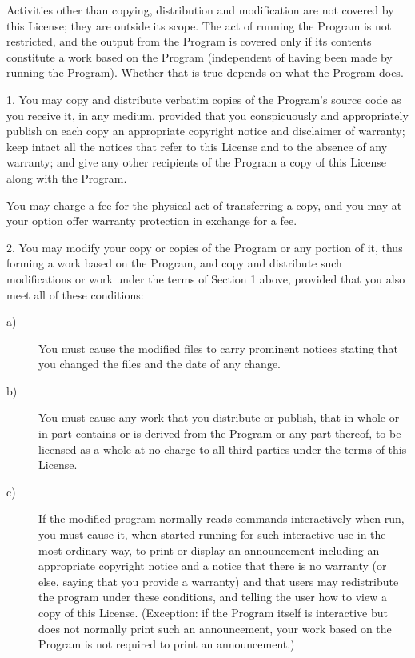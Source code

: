 Activities other than copying, distribution and modification are not
covered by this License; they are outside its scope.  The act of
running the Program is not restricted, and the output from the Program
is covered only if its contents constitute a work based on the
Program (independent of having been made by running the Program).
Whether that is true depends on what the Program does.

  1. You may copy and distribute verbatim copies of the Program's
source code as you receive it, in any medium, provided that you
conspicuously and appropriately publish on each copy an appropriate
copyright notice and disclaimer of warranty; keep intact all the
notices that refer to this License and to the absence of any warranty;
and give any other recipients of the Program a copy of this License
along with the Program.

You may charge a fee for the physical act of transferring a copy, and
you may at your option offer warranty protection in exchange for a fee.

  2. You may modify your copy or copies of the Program or any portion
of it, thus forming a work based on the Program, and copy and
distribute such modifications or work under the terms of Section 1
above, provided that you also meet all of these conditions:

\begin{description}
\item[a)] You must cause the modified files to carry prominent notices
  stating that you changed the files and the date of any change.
\item[b)] You must cause any work that you distribute or publish, that
  in whole or in part contains or is derived from the Program or any
  part thereof, to be licensed as a whole at no charge to all third
  parties under the terms of this License.
\item[c)] If the modified program normally reads commands
  interactively when run, you must cause it, when started running for
  such interactive use in the most ordinary way, to print or display
  an announcement including an appropriate copyright notice and a
  notice that there is no warranty (or else, saying that you provide a
  warranty) and that users may redistribute the program under these
  conditions, and telling the user how to view a copy of this License.
  (Exception: if the Program itself is interactive but does not
  normally print such an announcement, your work based on the Program
  is not required to print an announcement.)
\end{description}


